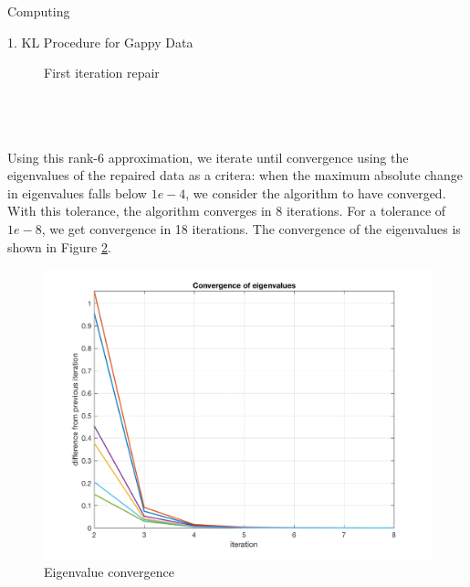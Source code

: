 \begin{section}{Computing}
\begin{homeworkSection}{1. KL Procedure for Gappy Data}
{\begin{minipage}{1.0\textwidth}
\begin{figure}[H]
        \caption{First iteration repair}
        \label{fig:x1}
        \end{figure}
    \end{minipage}
    \\
    \\
    \\
    Using this rank-6 approximation, we iterate until convergence using the eigenvalues of the repaired data as a critera: when the maximum absolute change in eigenvalues falls below $1e-4$, we consider the algorithm to have converged. With this tolerance, the algorithm converges in 8 iterations. For a tolerance of $1e-8$, we get convergence in 18 iterations. The convergence of the eigenvalues is shown in Figure \ref{fig:eigval_convergence}.
    \\
    \begin{minipage}{1.0\textwidth}
        \begin{figure}[H]
        \centering
        \includegraphics[trim={0cm 1cm 0cm 0cm},clip,width=0.70\columnwidth]{../data/eigval_convergence}
        \caption{Eigenvalue convergence}
        \label{fig:eigval_convergence}
        \end{figure}
    \end{minipage}
}
\newpage
{}
\end{homeworkSection}
\end{section}
